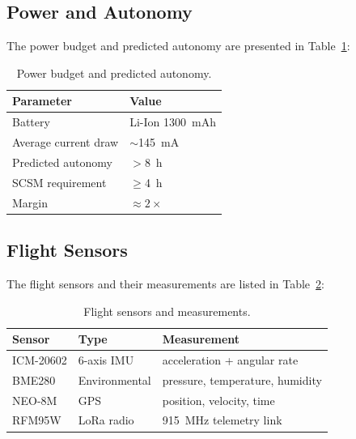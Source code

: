 \subsection{Power and Autonomy}

The power budget and predicted autonomy are presented in
Table~\ref{tab:power}:

\begin{table}[htbp]
\centering
{\small
\setlength{\tabcolsep}{6pt}
\begin{tabular}{>{\raggedright}p{5.2cm}l}
\toprule
\textbf{Parameter} & \textbf{Value} \\
\midrule
Battery & Li-Ion 1300~mAh \\
Average current draw & $\sim$145~mA \\
Predicted autonomy & $>$8~h \\
SCSM requirement & $\geq$4~h \\
Margin & $\approx 2\times$ \\
\bottomrule
\end{tabular}
\caption{Power budget and predicted autonomy.}\label{tab:power}
}
\end{table}

\subsection{Flight Sensors}

The flight sensors and their measurements are listed in
Table~\ref{tab:sensors}:

\begin{table}[htbp]
\centering
{\small
\setlength{\tabcolsep}{6pt}
\begin{tabular}{>{\raggedright}p{3.2cm}ll}
\toprule
\textbf{Sensor} & \textbf{Type} & \textbf{Measurement} \\
\midrule
ICM-20602 & 6-axis IMU & acceleration + angular rate \\
BME280 & Environmental & pressure, temperature, humidity \\
NEO-8M & GPS & position, velocity, time \\
RFM95W & LoRa radio & 915~MHz telemetry link \\
\bottomrule
\end{tabular}
\caption{Flight sensors and measurements.}\label{tab:sensors}
}
\end{table}

